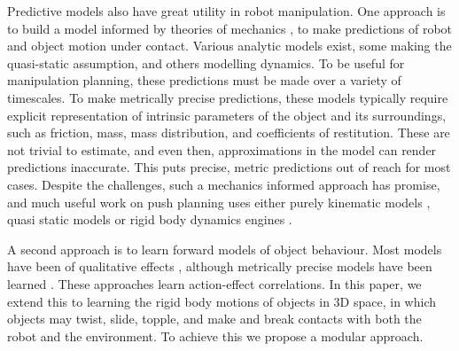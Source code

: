 Predictive models also have great utility in robot manipulation. One approach is to build a model informed by theories of mechanics \citep{mason_manipulator_1982,lynch_mechanics_1992,lynchmason96,peshkin_motion_1988,cappelleri_designing_2006,mason_mechanics_2001,flickinger2015}, to make predictions of robot and object motion under contact. Various analytic models exist, some making the quasi-static assumption, and others modelling dynamics.  To be useful for manipulation planning, these predictions must be made over a variety of timescales.
To make metrically precise predictions, these models typically require explicit representation of intrinsic parameters of the object and its surroundings, such as friction, mass, mass distribution, and coefficients of restitution. These are not trivial to estimate, and even then, approximations in the model can render predictions inaccurate. This puts precise, metric predictions out of reach for most cases. Despite the challenges, such a mechanics informed approach has promise, and much useful work on push planning uses either purely kinematic models \citep{stillman08ijrr}, quasi static models \citep{Dogar_2010,lynchmason96} or rigid body dynamics engines \cite{zitoetal-iros12,Cosgun2011}. 

A second approach is to learn forward models of object behaviour. Most models have been of qualitative effects \citep{montesano08,moldovan12,hermans11,fitzpatrick_learning_2003,ridge2010self,kroemer2014}, although metrically precise models have been learned \citep{mericli2014, scholz2010combining}. These approaches learn action-effect correlations. In this paper, we extend this to learning the rigid body motions of objects in 3D space, in which objects may twist, slide, topple, and make and break contacts with both the robot and the environment. To achieve this we propose a modular approach. 
